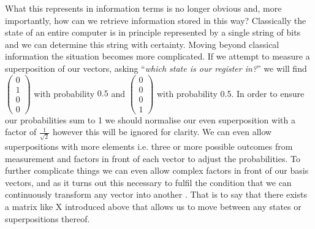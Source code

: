 What this represents in information terms is no longer obvious and, more importantly, how can we retrieve information stored in this way? Classically the state of an entire computer is in principle represented by a single string of bits and we can determine this string with certainty. Moving beyond classical information the situation becomes more complicated. If we attempt to measure a superposition of our vectors, asking ``\textit{which state is our register in?}'' we will find $\begin{pmatrix}  0 \\ 1 \\ 0 \\ 0 \end{pmatrix}$ with probability $0.5$ and $\begin{pmatrix}  0 \\ 0 \\ 0 \\ 1 \end{pmatrix}$ with probability 0.5. In order to ensure our probabilities sum to 1 we should normalise our even superposition with a factor of $\frac{1}{\sqrt{2}}$ however this will be ignored for clarity. We can even allow superpositions with more elements i.e. three or more possible outcomes from measurement and factors in front of each vector to adjust the probabilities. To further complicate things we can even allow complex factors in front of our basis vectors, and as it turns out this necessary to fulfil the condition that we can continuously transform any vector into another \cite{hardy2001quantum}. That is to say that there exists a matrix like X introduced above that allows us to move between any states or superpositions thereof. 


